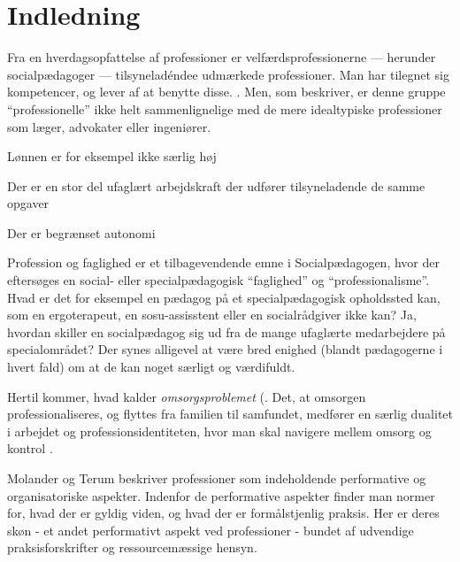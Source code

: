 \section{Indledning}

Fra en hverdagsopfattelse af professioner er velfærdsprofessionerne — herunder socialpædagoger — tilsyneladéndee udmærkede professioner. Man har tilegnet sig kompetencer, og lever af at benytte disse. \autocite[ss. 443-444]{frederiksenVelfaerdsprofessionerMellemOmsorg2017}.
Men, som \citeauthor{frederiksenVelfaerdsprofessionerMellemOmsorg2017} beskriver, er denne gruppe “professionelle” ikke helt sammenlignelige med de mere idealtypiske professioner som læger, advokater eller ingeniører.

Lønnen er for eksempel ikke særlig høj

Der er en stor del ufaglært arbejdskraft der udfører tilsyneladende de samme opgaver 

Der er begrænset autonomi


Profession og faglighed er et tilbagevendende emne i Socialpædagogen\autocite[fx]{petersenHvadSigerEksperten2019}, hvor der eftersøges en social- eller specialpædagogisk “faglighed” og “professionalisme”.
Hvad er det for eksempel en pædagog på et specialpædagogisk opholdssted kan, som en ergoterapeut, en sosu-assisstent eller en socialrådgiver ikke kan? Ja, hvordan skiller en socialpædagog sig ud fra de mange ufaglærte medarbejdere på specialområdet?
Der synes alligevel at være bred enighed (blandt pædagogerne i hvert fald) om at de kan noget særligt og værdifuldt.

Hertil kommer, hvad \citeauthor{frederiksenVelfaerdsprofessionerMellemOmsorg2017} kalder \textit{omsorgsproblemet} (.
Det, at omsorgen professionaliseres, og flyttes fra familien til samfundet, medfører en særlig dualitet i arbejdet og professionsidentiteten, hvor man skal navigere mellem omsorg og kontrol \autocite[s. 461]{frederiksenVelfaerdsprofessionerMellemOmsorg2017}.

Molander og Terum beskriver professioner som indeholdende performative og organisatoriske aspekter.
Indenfor de performative aspekter finder man normer for, hvad der er gyldig viden, og hvad der er formålstjenlig praksis.
Her er deres skøn - et andet performativt aspekt ved professioner - bundet af udvendige praksisforskrifter og ressourcemæssige hensyn.

